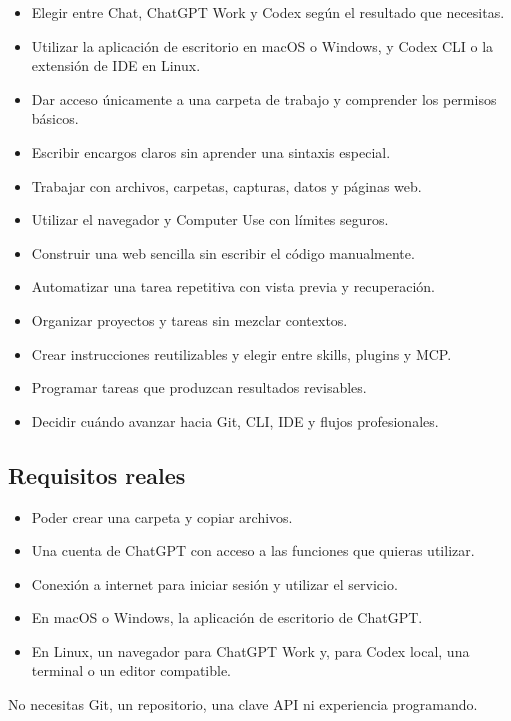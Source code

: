\documentclass[10pt,a4paper,openany]{book}
\providecommand{\tightlist}{\setlength{\itemsep}{0.18em}\setlength{\parskip}{0pt}}
\begin{document}
\begin{itemize}
\tightlist
\item
  Elegir entre Chat, ChatGPT Work y Codex según el resultado que
  necesitas.
\item
  Utilizar la aplicación de escritorio en macOS o Windows, y Codex CLI o
  la extensión de IDE en Linux.
\item
  Dar acceso únicamente a una carpeta de trabajo y comprender los
  permisos básicos.
\item
  Escribir encargos claros sin aprender una sintaxis especial.
\item
  Trabajar con archivos, carpetas, capturas, datos y páginas web.
\item
  Utilizar el navegador y Computer Use con límites seguros.
\item
  Construir una web sencilla sin escribir el código manualmente.
\item
  Automatizar una tarea repetitiva con vista previa y recuperación.
\item
  Organizar proyectos y tareas sin mezclar contextos.
\item
  Crear instrucciones reutilizables y elegir entre skills, plugins y
  MCP.
\item
  Programar tareas que produzcan resultados revisables.
\item
  Decidir cuándo avanzar hacia Git, CLI, IDE y flujos profesionales.
\end{itemize}

\subsection{Requisitos reales}\label{requisitos-reales}

\begin{itemize}
\tightlist
\item
  Poder crear una carpeta y copiar archivos.
\item
  Una cuenta de ChatGPT con acceso a las funciones que quieras utilizar.
\item
  Conexión a internet para iniciar sesión y utilizar el servicio.
\item
  En macOS o Windows, la aplicación de escritorio de ChatGPT.
\item
  En Linux, un navegador para ChatGPT Work y, para Codex local, una
  terminal o un editor compatible.
\end{itemize}

No necesitas Git, un repositorio, una clave API ni experiencia
programando.
\end{document}
